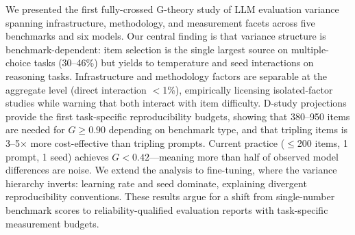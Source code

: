 \documentclass[11pt]{article}
\newcommand{\gcoeff}{G}
\begin{document}
We presented the first fully-crossed G-theory study of LLM evaluation variance spanning infrastructure, methodology, and measurement facets across five benchmarks and six models.
Our central finding is that variance structure is benchmark-dependent: item selection is the single largest source on multiple-choice tasks (30--46\%) but yields to temperature and seed interactions on reasoning tasks.
Infrastructure and methodology factors are separable at the aggregate level (direct interaction $<$1\%), empirically licensing isolated-factor studies while warning that both interact with item difficulty.
D-study projections provide the first task-specific reproducibility budgets, showing that 380--950 items are needed for $\gcoeff \geq 0.90$ depending on benchmark type, and that tripling items is 3--5$\times$ more cost-effective than tripling prompts.
Current practice ($\leq$200 items, 1 prompt, 1 seed) achieves $\gcoeff < 0.42$---meaning more than half of observed model differences are noise.
We extend the analysis to fine-tuning, where the variance hierarchy inverts: learning rate and seed dominate, explaining divergent reproducibility conventions.
These results argue for a shift from single-number benchmark scores to reliability-qualified evaluation reports with task-specific measurement budgets.


\end{document}
